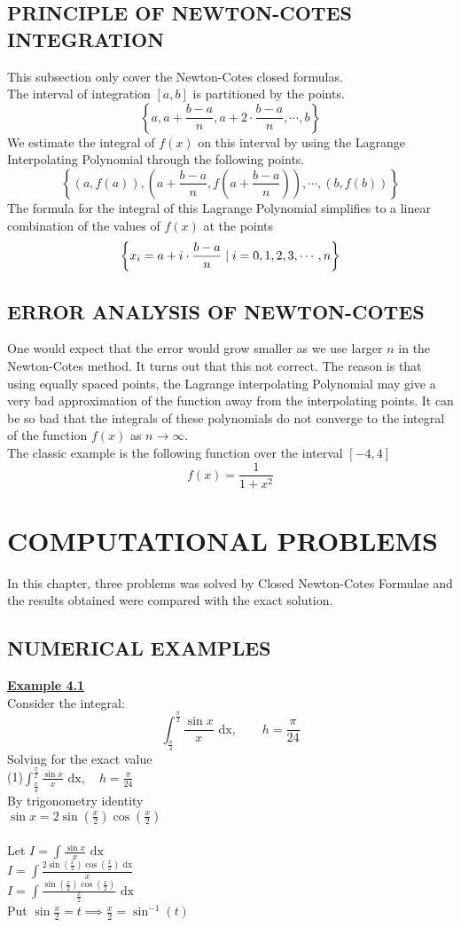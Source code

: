 \documentclass[12pt]{report}
\newcommand{\ubt}[1]{\textbf{\underline{#1}}}
\newcommand{\sps}{\\[0.2cm]}
\newcommand{\spn}[1]{\\[#1cm]}
\newcommand{\dsp}{\displaystyle}
\begin{document}
	\section{PRINCIPLE OF NEWTON-COTES INTEGRATION}
	This subsection only cover the Newton-Cotes closed formulas.\sps
	The interval of integration $[a,b]$ is partitioned by the points.
	$$
		\left\{a,a + \frac{b-a}{n}, a+2 \cdot \frac{b-a}{n}, \cdots, b\right\}
	$$
	We estimate the integral of $f(x)$ on this interval by using the Lagrange Interpolating Polynomial through the following points.
	$$
		\left\{\left(a,f(a)\right), \left(a + \frac{b-a}{n}, f\left(a + \frac{b-a}{n}\right)\right), \cdots,\left(b, f(b)\right)\right\}
	$$
	The formula for the integral of this Lagrange Polynomial simplifies to a linear combination of the values of $f(x)$ at the points
	$$
		\left\{x_i = a + i \cdot \frac{b-a}{n} \;\arrowvert \; i=0,1,2,3,\cdots,n \right\}
	$$
	
	\section{ERROR ANALYSIS OF NEWTON-COTES}
	One would expect that the error would grow smaller as we use larger $n$ in the Newton-Cotes method. It turns out that this not correct. The reason is that using equally spaced points, the Lagrange interpolating Polynomial may give a very bad approximation of the function away from the interpolating points. It can be so bad that the integrals of these polynomials do not converge to the integral of the function $f(x)$ as $n \rightarrow \infty$.\sps
	The classic example is the following function over the interval $[-4,4]$
	$$
		f(x) = \frac{1}{1 + x^2}
	$$
	
	\chapter{COMPUTATIONAL PROBLEMS}
	In this chapter, three problems was solved by Closed Newton-Cotes Formulae and the results obtained  were compared with the exact solution.\\
	
	\section{NUMERICAL EXAMPLES}
	\ubt{Example 4.1}\\
	Consider the integral:
	$$
		\int_{\frac{\pi}{4}}^{\frac{\pi}{2}} \frac{\sin x}{x} \text{ dx},\qquad h = \frac{\pi}{24}
	$$
	\newpage
	Solving for the exact value\spn{0.6}
	(1)$\dsp\int_{\frac{\pi}{4}}^{\frac{\pi}{2}} \frac{\sin x}{x} \text{ dx},\quad h = \frac{\pi}{24}$\spn{0.5}
	By trigonometry identity\\
	$\dsp \sin x = 2 \sin(\frac{x}{2})\cos(\frac{x}{2})$\\
	\\Let $\dsp I = \int \frac{\sin x}{x} \text{ dx}$\spn{0.6}
	$\dsp I = \int \frac{2\sin(\frac{x}{2})\cos(\frac{x}{2})\text{ dx}}{x}$\spn{0.7}
	$\dsp I = \int \frac{\sin(\frac{x}{2})\cos(\frac{x}{2})}{\frac{x}{2}}\text{ dx}$\spn{0.7}
	Put $\dsp \sin \frac{x}{2} = t \implies \frac{x}{2} = \sin^{-1}(t)$\\
	
\end{document}
